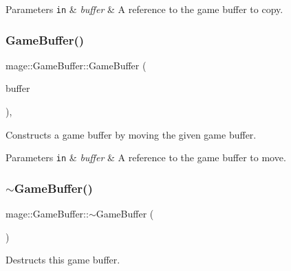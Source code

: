 \begin{DoxyParams}[1]{Parameters}
\mbox{\tt in}  & {\em buffer} & A reference to the game buffer to copy. \\
\hline
\end{DoxyParams}
\hypertarget{structmage_1_1_game_buffer_a8662856a966635e06583bf3a6420b7c1}{}\label{structmage_1_1_game_buffer_a8662856a966635e06583bf3a6420b7c1} 
\subsubsection{\texorpdfstring{Game\+Buffer()}{GameBuffer()}\hspace{0.1cm}{\footnotesize\ttfamily [3/3]}}
{\footnotesize\ttfamily mage\+::\+Game\+Buffer\+::\+Game\+Buffer (\begin{DoxyParamCaption}\item[{\hyperlink{structmage_1_1_game_buffer}{Game\+Buffer} \&\&}]{buffer }\end{DoxyParamCaption})\hspace{0.3cm}{\ttfamily [default]}, {\ttfamily [noexcept]}}

Constructs a game buffer by moving the given game buffer.


\begin{DoxyParams}[1]{Parameters}
\mbox{\tt in}  & {\em buffer} & A reference to the game buffer to move. \\
\hline
\end{DoxyParams}
\hypertarget{structmage_1_1_game_buffer_ac1ae097a91a446184b71bb4dd9acf8b4}{}\label{structmage_1_1_game_buffer_ac1ae097a91a446184b71bb4dd9acf8b4} 
\subsubsection{\texorpdfstring{$\sim$\+Game\+Buffer()}{~GameBuffer()}}
{\footnotesize\ttfamily mage\+::\+Game\+Buffer\+::$\sim$\+Game\+Buffer (\begin{DoxyParamCaption}{ }\end{DoxyParamCaption})\hspace{0.3cm}{\ttfamily [default]}}

Destructs this game buffer. 

